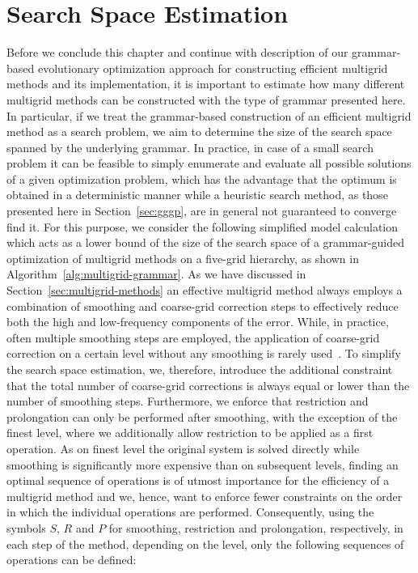 \section{Search Space Estimation}
Before we conclude this chapter and continue with description of our grammar-based evolutionary optimization approach for constructing efficient multigrid methods and its implementation, it is important to estimate how many different multigrid methods can be constructed with the type of grammar presented here.
In particular, if we treat the grammar-based construction of an efficient multigrid method as a search problem, we aim to determine the size of the search space spanned by the underlying grammar.
In practice, in case of a small search problem it can be feasible to simply enumerate and evaluate all possible solutions of a given optimization problem, which has the advantage that the optimum is obtained in a deterministic manner while a heuristic search method, as those presented here in Section~\ref{sec:gggp}, are in general not guaranteed to converge find it.
For this purpose, we consider the following simplified model calculation which acts as a lower bound of the size of the search space of a grammar-guided optimization of multigrid methods on a five-grid hierarchy, as shown in Algorithm~\ref{alg:multigrid-grammar}. 
As we have discussed in Section~\ref{sec:multigrid-methods} an effective multigrid method always employs a combination of smoothing and coarse-grid correction steps to effectively reduce both the high and low-frequency components of the error.
While, in practice, often multiple smoothing steps are employed, the application of coarse-grid correction on a certain level without any smoothing is rarely used~\cite{trottenberg2000multigrid}.
To simplify the search space estimation, we, therefore, introduce the additional constraint that the total number of coarse-grid corrections is always equal or lower than the number of smoothing steps.
Furthermore, we enforce that restriction and prolongation can only be performed after smoothing, with the exception of the finest level, where we additionally allow restriction to be applied as a first operation.
As on finest level the original system is solved directly while smoothing is significantly more expensive than on subsequent levels, finding an optimal sequence of operations is of utmost importance for the efficiency of a multigrid method and we, hence, want to enforce fewer constraints on the order in which the individual operations are performed.
Consequently, using the symbols $S$, $R$ and $P$ for smoothing, restriction and prolongation, respectively, in each step of the method, depending on the level, only the following sequences of operations can be defined:
